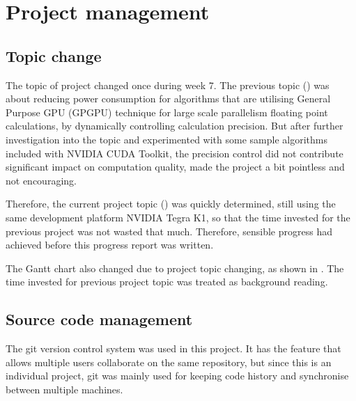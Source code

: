 \chapter{Project management}

\section{Topic change}

The topic of project changed once during week 7. The previous topic () was about reducing power consumption for algorithms that are utilising General Purpose GPU (GPGPU) technique for large scale parallelism floating point calculations, by dynamically controlling calculation precision. But after further investigation into the topic and experimented with some sample algorithms included with NVIDIA CUDA Toolkit, the precision control did not contribute significant impact on computation quality, made the project a bit pointless and not encouraging.

Therefore, the current project topic () was quickly determined, still using the same development platform NVIDIA Tegra K1, so that the time invested for the previous project was not wasted that much. Therefore, sensible progress had achieved before this progress report was written.

The Gantt chart also changed due to project topic changing, as shown in . The time invested for previous project topic was treated as background reading.

\section{Source code management}

The git version control system \cite{git} was used in this project. It has the feature that allows multiple users collaborate on the same repository, but since this is an individual project, git was mainly used for keeping code history and synchronise between multiple machines.



